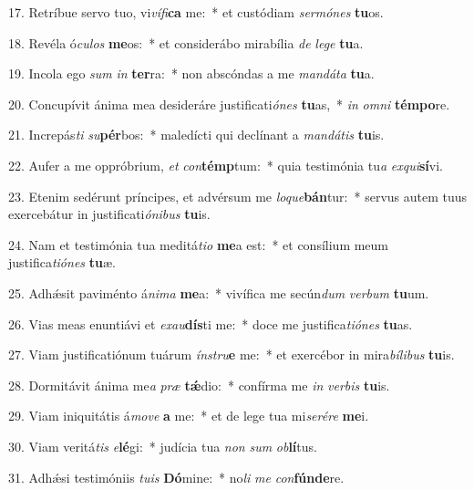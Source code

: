17. Retríbue servo tuo, vi\textit{ví}\textit{fi}\textbf{ca} me:~*  et custódiam \textit{ser}\textit{mó}\textit{nes} \textbf{tu}os.\

18. Revéla ó\textit{cu}\textit{los} \textbf{me}os:~*  et considerábo mirabília \textit{de} \textit{le}\textit{ge} \textbf{tu}a.\

19. Incola ego \textit{sum} \textit{in} \textbf{ter}ra:~*  non abscóndas a me \textit{man}\textit{dá}\textit{ta} \textbf{tu}a.\

20. Concupívit ánima mea desideráre justificati\textit{ó}\textit{nes} \textbf{tu}as,~*  \textit{in} \textit{om}\textit{ni} \textbf{tém}\textbf{po}re.\

21. Increpás\textit{ti} \textit{su}\textbf{pér}bos:~*  maledícti qui declínant a \textit{man}\textit{dá}\textit{tis} \textbf{tu}is.\

22. Aufer a me oppróbrium, \textit{et} \textit{con}\textbf{témp}tum:~*  quia testimónia tu\textit{a} \textit{ex}\textit{qui}\textbf{sí}vi.\

23. Etenim sedérunt príncipes, et advérsum me \textit{lo}\textit{que}\textbf{bán}tur:~*  servus autem tuus exercebátur in justificati\textit{ó}\textit{ni}\textit{bus} \textbf{tu}is.\

24. Nam et testimónia tua meditá\textit{ti}\textit{o} \textbf{me}a est:~*  et consílium meum justifica\textit{ti}\textit{ó}\textit{nes} \textbf{tu}æ.\

25. Adhǽsit paviménto á\textit{ni}\textit{ma} \textbf{me}a:~*  vivífica me secún\textit{dum} \textit{ver}\textit{bum} \textbf{tu}um.\

26. Vias meas enuntiávi et \textit{ex}\textit{au}\textbf{dís}ti me:~*  doce me justifica\textit{ti}\textit{ó}\textit{nes} \textbf{tu}as.\

27. Viam justificatiónum tuárum \textit{ín}\textit{stru}\textbf{e} me:~*  et exercébor in mira\textit{bí}\textit{li}\textit{bus} \textbf{tu}is.\

28. Dormitávit ánima me\textit{a} \textit{præ} \textbf{tǽ}dio:~*  confírma me \textit{in} \textit{ver}\textit{bis} \textbf{tu}is.\

29. Viam iniquitátis á\textit{mo}\textit{ve} \textbf{a} me:~*  et de lege tua mi\textit{se}\textit{ré}\textit{re} \textbf{me}i.\

30. Viam veritá\textit{tis} \textit{e}\textbf{lé}gi:~*  judícia tua \textit{non} \textit{sum} \textit{ob}\textbf{lí}tus.\

31. Adhǽsi testimóniis \textit{tu}\textit{is} \textbf{Dó}mine:~*  no\textit{li} \textit{me} \textit{con}\textbf{fún}\textbf{de}re.\

